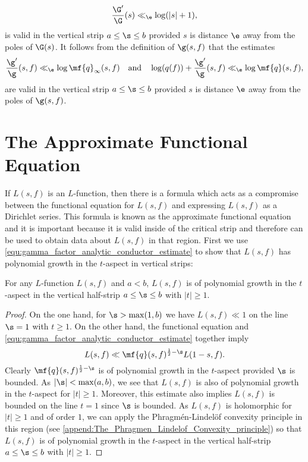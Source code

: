     \[
      \frac{\G'}{\G}(s) \ll_{\e} \log(|s|+1),
    \]
    is valid in the vertical strip $a \le \s \le b$ provided $s$ is distance $\e$ away from the poles of $\G(s)$. It follows from the definition of $\g(s,f)$ that the estimates
    \begin{equation}\label{equ:digamma_gamma_factor_analytic_conductor_estimate}
      \frac{\g'}{\g}(s,f) \ll_{\e} \log\mf{q}_{\infty}(s,f) \quad \text{and} \quad \log(q(f))+\frac{\g'}{\g}(s,f) \ll_{\e} \log\mf{q}(s,f),
    \end{equation}
    are valid in the vertical strip $a \le \s \le b$ provided $s$ is distance $\e$ away from the poles of $\g(s,f)$. 
  \section{The Approximate Functional Equation}
    If $L(s,f)$ is an $L$-function, then there is a formula which acts as a compromise between the functional equation for $L(s,f)$ and expressing $L(s,f)$ as a Dirichlet series. This formula is known as the approximate functional equation and it is important because it is valid inside of the critical strip and therefore can be used to obtain data about $L(s,f)$ in that region. First we use \cref{equ:gamma_factor_analytic_conductor_estimate} to show that $L(s,f)$ has polynomial growth in the $t$-aspect in vertical strips:

    \begin{proposition}\label{prop:L_function_bounded_in_vertical_strips}
      For any $L$-function $L(s,f)$ and $a < b$, $L(s,f)$ is of polynomial growth in the $t$-aspect in the vertical half-strip $a \le \s \le b$ with $|t| \ge 1$.
    \end{proposition}
    \begin{proof}
      On the one hand, for $\s > \max(1,b)$ we have $L(s,f) \ll 1$ on the line $\s = 1$ with $t \ge 1$. On the other hand, the functional equation and \cref{equ:gamma_factor_analytic_conductor_estimate} together imply
      \[
        L(s,f) \ll \mf{q}(s,f)^{\frac{1}{2}-\s}L(1-s,f).
      \]
      Clearly $\mf{q}(s,f)^{\frac{1}{2}-\s}$ is of polynomial growth in the $t$-aspect provided $\s$ is bounded. As $|\s| < \max(a,b)$, we see that $L(s,f)$ is also of polynomial growth in the $t$-aspect for $|t| \ge 1$. Moreover, this estimate also implies $L(s,f)$ is bounded on the line $t = 1$ since $\s$ is bounded. As $L(s,f)$ is holomorphic for $|t| \ge 1$ and of order $1$, we can apply the Phragm\'en-Lindel\"of convexity principle in this region (see \cref{append:The_Phragmen_Lindelof_Convexity_principle}) so that $L(s,f)$ is of polynomial growth in the $t$-aspect in the vertical half-strip $a \le \s \le b$ with $|t| \ge 1$.
    \end{proof}

